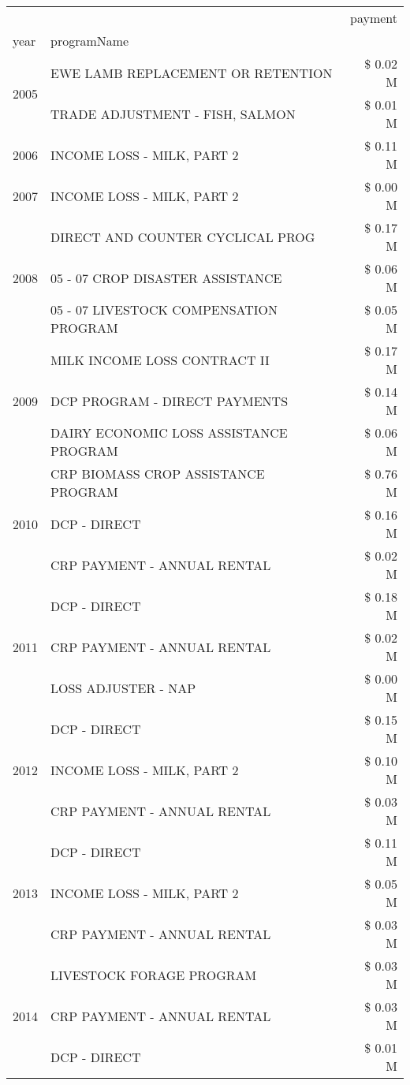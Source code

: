 \begin{tabular}{llr}
\toprule
 &  & payment \\
year & programName &  \\
\midrule
\multirow[t]{2}{*}{2005} & EWE LAMB REPLACEMENT OR RETENTION & \$ 0.02 M \\
 & TRADE ADJUSTMENT - FISH, SALMON & \$ 0.01 M \\
\cline{1-3}
2006 & INCOME LOSS - MILK, PART 2 & \$ 0.11 M \\
\cline{1-3}
2007 & INCOME LOSS - MILK, PART 2 & \$ 0.00 M \\
\cline{1-3}
\multirow[t]{3}{*}{2008} & DIRECT AND COUNTER CYCLICAL PROG & \$ 0.17 M \\
 & 05 - 07 CROP DISASTER ASSISTANCE & \$ 0.06 M \\
 & 05 - 07 LIVESTOCK COMPENSATION PROGRAM & \$ 0.05 M \\
\cline{1-3}
\multirow[t]{3}{*}{2009} & MILK INCOME LOSS CONTRACT II & \$ 0.17 M \\
 & DCP PROGRAM - DIRECT PAYMENTS & \$ 0.14 M \\
 & DAIRY ECONOMIC LOSS ASSISTANCE PROGRAM & \$ 0.06 M \\
\cline{1-3}
\multirow[t]{3}{*}{2010} & CRP BIOMASS CROP ASSISTANCE PROGRAM & \$ 0.76 M \\
 & DCP - DIRECT & \$ 0.16 M \\
 & CRP PAYMENT - ANNUAL RENTAL & \$ 0.02 M \\
\cline{1-3}
\multirow[t]{3}{*}{2011} & DCP - DIRECT & \$ 0.18 M \\
 & CRP PAYMENT - ANNUAL RENTAL & \$ 0.02 M \\
 & LOSS ADJUSTER - NAP & \$ 0.00 M \\
\cline{1-3}
\multirow[t]{3}{*}{2012} & DCP - DIRECT & \$ 0.15 M \\
 & INCOME LOSS - MILK, PART 2 & \$ 0.10 M \\
 & CRP PAYMENT - ANNUAL RENTAL & \$ 0.03 M \\
\cline{1-3}
\multirow[t]{3}{*}{2013} & DCP - DIRECT & \$ 0.11 M \\
 & INCOME LOSS - MILK, PART 2 & \$ 0.05 M \\
 & CRP PAYMENT - ANNUAL RENTAL & \$ 0.03 M \\
\cline{1-3}
\multirow[t]{3}{*}{2014} & LIVESTOCK FORAGE PROGRAM & \$ 0.03 M \\
 & CRP PAYMENT - ANNUAL RENTAL & \$ 0.03 M \\
 & DCP - DIRECT & \$ 0.01 M \\

\end{tabular}
